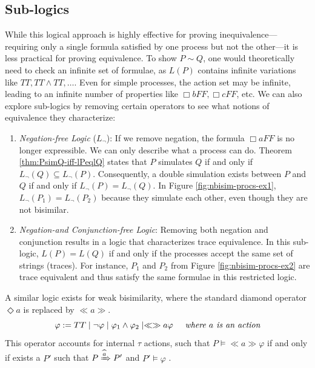 \subsection{Sub-logics}
While this logical approach is highly effective for proving inequivalence—requiring only a single formula satisfied by one process but not the other—it is less practical for proving equivalence. To show $P \sim Q$, one would theoretically need to check an infinite set of formulae, as $L(P)$ contains infinite variations like $TT, TT \wedge TT, \dots$. Even for simple processes, the action set may be infinite, leading to an infinite number of properties like $\Box b FF, \Box c FF$, etc.  
We can also explore sub-logics by removing certain operators to see what notions of equivalence they characterize:
\begin{enumerate}
    \item \textit{Negation-free Logic} ($L_\neg$): If we remove negation, the formula $\Box a FF$ is no longer expressible. We can only describe what a process can do. Theorem \ref{thm:PsimQ-iff-lPeqlQ} states that $P$ simulates $Q$ if and only if $L_\neg(Q) \subseteq L_\neg(P)$. Consequently, a double simulation exists between $P$ and $Q$ if and only if $L_\neg(P) = L_\neg(Q)$. In Figure \ref{fig:nbisim-procs-ex1}, $L_\neg(P_1) = L_\neg(P_2)$ because they simulate each other, even though they are not bisimilar.  
    \item \textit{Negation-and Conjunction-free Logic}: Removing both negation and conjunction results in a logic that characterizes trace equivalence. In this sub-logic, $L(P) = L(Q)$ if and only if the processes accept the same set of strings (traces). For instance, $P_1$ and $P_2$ from Figure \ref{fig:nbisim-procs-ex2} are trace equivalent and thus satisfy the same formulae in this restricted logic.  
\end{enumerate}

A similar logic exists for weak bisimilarity, where the standard diamond operator $\Diamond a$ is replaced by $\ll a \gg$.
\begin{equation*}
    \varphi := TT \mid \neg\varphi \mid \varphi_1 \wedge \varphi_2 \mid \ll\gg a \varphi \hspace{0.5cm}\textit{where }a\textit{ is an action}
\end{equation*}
This operator accounts for internal $\tau$ actions, such that $P \models \ll a \gg \varphi$ if and only if exists a $P'$ such that $P \xRightarrow{\widehat{a}} P'$ and $P' \models \varphi$ .  

